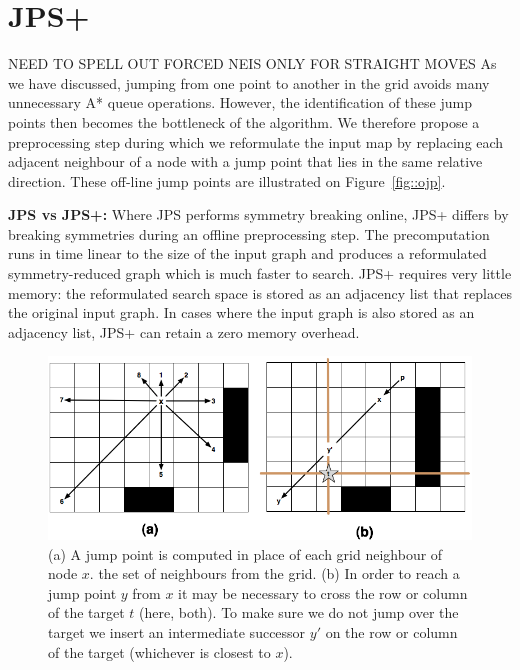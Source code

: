 \section{JPS+}
\label{sec:pre}

NEED TO SPELL OUT FORCED NEIS ONLY FOR STRAIGHT MOVES
As we have discussed, jumping from one point to another in the grid
avoids many unnecessary A* queue operations. However, the identification
of these jump points then becomes the bottleneck of the algorithm. 
We therefore propose a preprocessing step during which we reformulate
the input map by replacing each adjacent neighbour of a node with
a jump point that lies in the same relative direction.
These off-line jump points are illustrated on Figure~\ref{fig::ojp}.  

\textbf{JPS vs JPS+:} 
Where JPS performs symmetry breaking online, JPS+ differs by breaking
symmetries during an offline preprocessing step. 
The precomputation runs in time linear to the size of the input graph
and produces a reformulated symmetry-reduced graph which is much faster
to search. JPS+ requires very little memory: the reformulated search space
is stored as an adjacency list that replaces the original input graph.
In cases where the input graph is also stored as an adjacency list, JPS+
can retain a zero memory overhead.


\begin{figure}[tb]
       \begin{center}
		   \includegraphics[width=0.95\columnwidth]
			{diagrams/preproc.png}
       \end{center}
	\vspace{-3pt}
       \caption{(a) A jump point is computed in place of each grid neighbour of node $x$.
		the set of neighbours from the grid. (b) In order to reach a jump point $y$ from $x$ it may be
necessary to cross the row or column of the target $t$ (here, both). To make sure we do not jump over 
the target we insert an intermediate successor $y'$ on the row or column of the target (whichever is closest to $x$).}
       \label{fig:preproc}
\end{figure}

